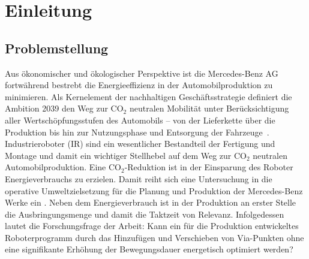 \chapter{Einleitung}
\label{cha:Einleitung}

\section{Problemstellung}
Aus ökonomischer und ökologischer Perspektive ist die Mercedes-Benz AG fortwährend bestrebt die Energieeffizienz in der Automobilproduktion  zu minimieren. Als Kernelement der nachhaltigen Geschäftsstrategie definiert die Ambition 2039 den Weg zur $\text{CO}_2$ neutralen Mobilität unter Berücksichtigung aller \glqq Wertschöpfungsstufen des Automobils – von der Lieferkette über die Produktion bis hin zur Nutzungsphase und Entsorgung der Fahrzeuge\grqq~\cite[S.~15]{Stapmanns.2022}. Industrieroboter  (IR) sind ein wesentlicher Bestandteil der Fertigung und Montage und damit ein wichtiger Stellhebel auf dem Weg zur $\text{CO}_2$ neutralen Automobilproduktion.
Eine $\text{CO}_2$-Reduktion ist in der Einsparung des Roboter Energieverbrauchs zu erzielen. Damit reiht sich eine Untersuchung in die operative Umweltzielsetzung für die Planung und Produktion der Mercedes-Benz Werke ein \cite[S.~21]{Stapmanns.2022}. Neben dem Energieverbrauch ist in der Produktion an erster Stelle die Ausbringungsmenge und damit die Taktzeit von Relevanz. Infolgedessen lautet die Forschungsfrage der Arbeit: Kann ein für die Produktion entwickeltes Roboterprogramm durch das Hinzufügen und Verschieben von Via-Punkten ohne eine signifikante Erhöhung der Bewegungsdauer energetisch optimiert werden? 
% 
